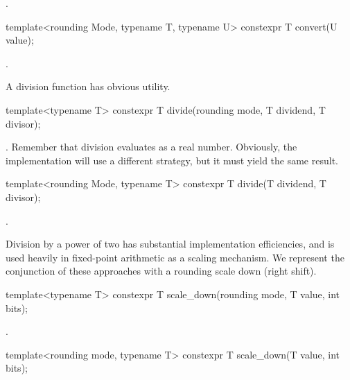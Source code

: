 \begin{addedblock}
\begin{itemdescr}
\returns {}.
\end{itemdescr}

\begin{itemdecl}
template<rounding Mode, typename T, typename U>
constexpr T convert(U value);
\end{itemdecl}

\begin{itemdescr}
\returns {}.
\end{itemdescr}

A division function has obvious utility.

\begin{itemdecl}
template<typename T>
constexpr T divide(rounding mode, T dividend, T divisor);
\end{itemdecl}

\begin{itemdescr}
\returns {}. Remember that division evaluates as a real number. Obviously, the implementation will use a different strategy, but it must yield the same result.
\end{itemdescr}

\begin{itemdecl}
template<rounding Mode, typename T>
constexpr T divide(T dividend, T divisor);
\end{itemdecl}

\begin{itemdescr}
\returns {}.
\end{itemdescr}

Division by a power of two has substantial implementation efficiencies, and is used heavily in fixed-point arithmetic as a scaling mechanism. We represent the conjunction of these approaches with a rounding scale down (right shift).

\begin{itemdecl}
template<typename T>
constexpr T scale_down(rounding mode, T value, int bits);
\end{itemdecl}

\begin{itemdescr}
\returns {}.
\end{itemdescr}

\begin{itemdecl}
template<rounding mode, typename T>
constexpr T scale_down(T value, int bits);
\end{itemdecl}


\end{addedblock}
